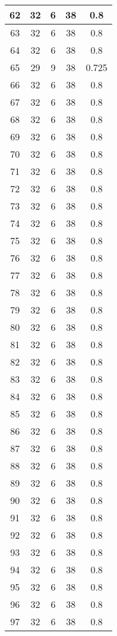 \documentclass[letterpaper, 12pt]{article}
\begin{document}
\begin{longtable}{|c|c|c|c|c|}
\hline
62 & 32 & 6 & 38 & 0.8 \\
\hline
63 & 32 & 6 & 38 & 0.8 \\
\hline
64 & 32 & 6 & 38 & 0.8 \\
\hline
65 & 29 & 9 & 38 & 0.725 \\
\hline
66 & 32 & 6 & 38 & 0.8 \\
\hline
67 & 32 & 6 & 38 & 0.8 \\
\hline
68 & 32 & 6 & 38 & 0.8 \\
\hline
69 & 32 & 6 & 38 & 0.8 \\
\hline
70 & 32 & 6 & 38 & 0.8 \\
\hline
71 & 32 & 6 & 38 & 0.8 \\
\hline
72 & 32 & 6 & 38 & 0.8 \\
\hline
73 & 32 & 6 & 38 & 0.8 \\
\hline
74 & 32 & 6 & 38 & 0.8 \\
\hline
75 & 32 & 6 & 38 & 0.8 \\
\hline
76 & 32 & 6 & 38 & 0.8 \\
\hline
77 & 32 & 6 & 38 & 0.8 \\
\hline
78 & 32 & 6 & 38 & 0.8 \\
\hline
79 & 32 & 6 & 38 & 0.8 \\
\hline
80 & 32 & 6 & 38 & 0.8 \\
\hline
81 & 32 & 6 & 38 & 0.8 \\
\hline
82 & 32 & 6 & 38 & 0.8 \\
\hline
83 & 32 & 6 & 38 & 0.8 \\
\hline
84 & 32 & 6 & 38 & 0.8 \\
\hline
85 & 32 & 6 & 38 & 0.8 \\
\hline
86 & 32 & 6 & 38 & 0.8 \\
\hline
87 & 32 & 6 & 38 & 0.8 \\
\hline
88 & 32 & 6 & 38 & 0.8 \\
\hline
89 & 32 & 6 & 38 & 0.8 \\
\hline
90 & 32 & 6 & 38 & 0.8 \\
\hline
91 & 32 & 6 & 38 & 0.8 \\
\hline
92 & 32 & 6 & 38 & 0.8 \\
\hline
93 & 32 & 6 & 38 & 0.8 \\
\hline
94 & 32 & 6 & 38 & 0.8 \\
\hline
95 & 32 & 6 & 38 & 0.8 \\
\hline
96 & 32 & 6 & 38 & 0.8 \\
\hline
97 & 32 & 6 & 38 & 0.8 \\

\end{longtable}
\end{document}
